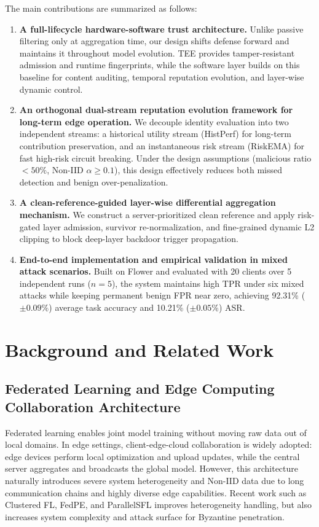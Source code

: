 \documentclass[runningheads]{llncs}
\begin{document}
The main contributions are summarized as follows:
\begin{enumerate}
    \item \textbf{A full-lifecycle hardware-software trust architecture.} Unlike passive filtering only at aggregation time, our design shifts defense forward and maintains it throughout model evolution. TEE provides tamper-resistant admission and runtime fingerprints, while the software layer builds on this baseline for content auditing, temporal reputation evolution, and layer-wise dynamic control.
    \item \textbf{An orthogonal dual-stream reputation evolution framework for long-term edge operation.} We decouple identity evaluation into two independent streams: a historical utility stream (HistPerf) for long-term contribution preservation, and an instantaneous risk stream (RiskEMA) for fast high-risk circuit breaking. Under the design assumptions (malicious ratio $<50\%$, Non-IID $\alpha \geq 0.1$), this design effectively reduces both missed detection and benign over-penalization.
    \item \textbf{A clean-reference-guided layer-wise differential aggregation mechanism.} We construct a server-prioritized clean reference and apply risk-gated layer admission, survivor re-normalization, and fine-grained dynamic L2 clipping to block deep-layer backdoor trigger propagation.
    \item \textbf{End-to-end implementation and empirical validation in mixed attack scenarios.} Built on Flower and evaluated with 20 clients over 5 independent runs ($n=5$), the system maintains high TPR under six mixed attacks while keeping permanent benign FPR near zero, achieving 92.31\% ($\pm 0.09\%$) average task accuracy and 10.21\% ($\pm 0.05\%$) ASR.
\end{enumerate}

\section{Background and Related Work}

\subsection{Federated Learning and Edge Computing Collaboration Architecture}
Federated learning enables joint model training without moving raw data out of local domains. In edge settings, client-edge-cloud collaboration is widely adopted: edge devices perform local optimization and upload updates, while the central server aggregates and broadcasts the global model. However, this architecture naturally introduces severe system heterogeneity and Non-IID data due to long communication chains and highly diverse edge capabilities. Recent work such as Clustered FL\cite{r9_clustered}, FedPE\cite{fedpe}, and ParallelSFL\cite{parallelsfl} improves heterogeneity handling, but also increases system complexity and attack surface for Byzantine penetration.
\end{document}
